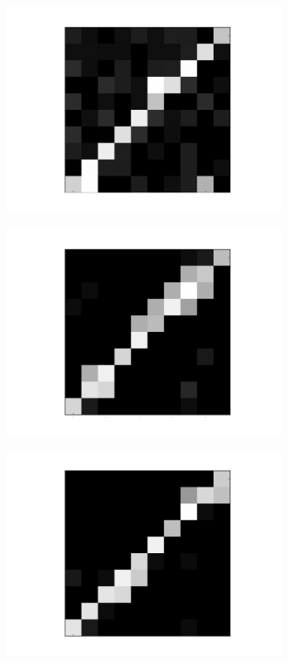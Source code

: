 \begin{figure}[h!]
	\centering
	\begin{subfigure}{.25\textwidth}
  		\centering
  		\includegraphics[width=0.8\linewidth]{imgs/reconst/00001.png}
  		\label{fig:sub1}
	\end{subfigure}%
	\begin{subfigure}{.25\textwidth}
  		\centering
  		\includegraphics[width=0.8\linewidth]{imgs/reconst/00003.png}
  		\label{fig:sub1}
	\end{subfigure}%
	\begin{subfigure}{.25\textwidth}
  		\centering
  		\includegraphics[width=0.8\linewidth]{imgs/reconst/00005.png}

\end{subfigure}
\end{figure}
